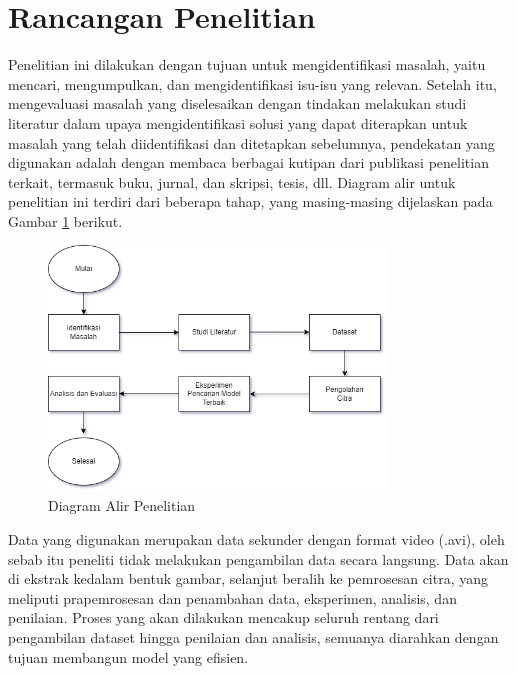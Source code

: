 \vspace{1cm}

\section{Rancangan Penelitian}

   Penelitian ini dilakukan dengan tujuan untuk mengidentifikasi  masalah, yaitu mencari, mengumpulkan, dan mengidentifikasi isu-isu yang relevan. Setelah itu, mengevaluasi masalah yang diselesaikan dengan tindakan melakukan studi literatur dalam upaya mengidentifikasi solusi yang dapat diterapkan untuk masalah yang telah diidentifikasi dan ditetapkan sebelumnya, pendekatan yang digunakan adalah dengan membaca berbagai kutipan dari publikasi penelitian terkait, termasuk buku, jurnal, dan skripsi, tesis, dll. Diagram alir untuk penelitian ini terdiri dari beberapa tahap, yang masing-masing dijelaskan pada Gambar \ref{Diagram Alir Penelitian} berikut. 



    \begin{figure}[H]
      \centering
      \includegraphics[width=0.8\textwidth]{figures/bab3/Diagram alir penelitian.png}
      \caption{Diagram Alir Penelitian}
      \label{Diagram Alir Penelitian}
      \medskip %
      \begin{minipage}{0.8\textwidth}
        \centering
      \end{minipage}
    \end{figure}


    Data yang digunakan merupakan data sekunder dengan format video (.avi), oleh sebab itu peneliti tidak melakukan
     pengambilan data secara langsung. Data akan di ekstrak kedalam bentuk gambar, selanjut beralih ke pemrosesan citra, 
     yang meliputi prapemrosesan dan penambahan data, eksperimen, analisis, dan penilaian. Proses yang akan dilakukan 
     mencakup seluruh rentang dari  pengambilan dataset hingga penilaian dan analisis, semuanya diarahkan dengan tujuan 
     membangun model yang efisien. 
    
